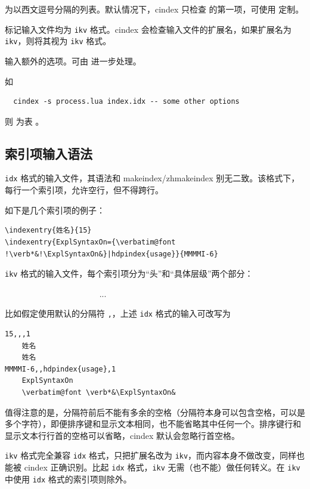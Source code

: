 \documentclass[class=article,doc={kv-usage}]{cusdoc}
\newcommand*\LUA{\texorpdfstring{\textcon{lua}}{lua}}
\begin{document}
\begin{description}
   为以西文逗号分隔的列表。默认情况下，cindex 只检查  的第一项，可使用 \LUA 定制。
  \item[\texttt{--kv}] 标记输入文件均为 \texttt{ikv} 格式。cindex 会检查输入文件的扩展名，如果扩展名为 \texttt{ikv}，则将其视为 \texttt{ikv} 格式。
  \item[\texttt{--} \meta{extras}] 输入额外的选项。可由 \LUA 进一步处理。
\end{description}

如
\begin{verbatim}
  cindex -s process.lua index.idx -- some other options
\end{verbatim}
则  为表 。

\subsection{索引项输入语法}

\texttt{idx} 格式的输入文件，其语法和 makeindex/zhmakeindex 别无二致。该格式下，每行一个索引项，允许空行，但不得跨行。

如下是几个索引项的例子：

\begin{verbatim}
\indexentry{姓名}{15}
\indexentry{ExplSyntaxOn={\verbatim@font !\verb*&!\ExplSyntaxOn&}|hdpindex{usage}}{MMMMI-6}
\end{verbatim}

\texttt{ikv} 格式的输入文件，每个索引项分为“头”和“具体层级”两个部分：

\begin{syntax}
~~~~
~~~~
~~~~
~~~~
~~~~...
\end{syntax}

比如假定使用默认的分隔符 \texttt{,}，上述 \texttt{idx} 格式的输入可改写为
\begin{verbatim}
15,,,1
    姓名
    姓名
MMMMI-6,,hdpindex{usage},1
    ExplSyntaxOn
    \verbatim@font \verb*&\ExplSyntaxOn&
\end{verbatim}

值得注意的是，分隔符前后不能有多余的空格（分隔符本身可以包含空格，可以是多个字符），即便排序键和显示文本相同，也不能省略其中任何一个。排序键行和显示文本行行首的空格可以省略，cindex 默认会忽略行首空格。

\texttt{ikv} 格式完全兼容 \texttt{idx} 格式，只把扩展名改为 \texttt{ikv}，而内容本身不做改变，同样也能被 cindex 正确识别。比起 \texttt{idx} 格式，\texttt{ikv} 无需（也不能）做任何转义。在 \texttt{ikv} 中使用 \texttt{idx} 格式的索引项则除外。
\end{document}
